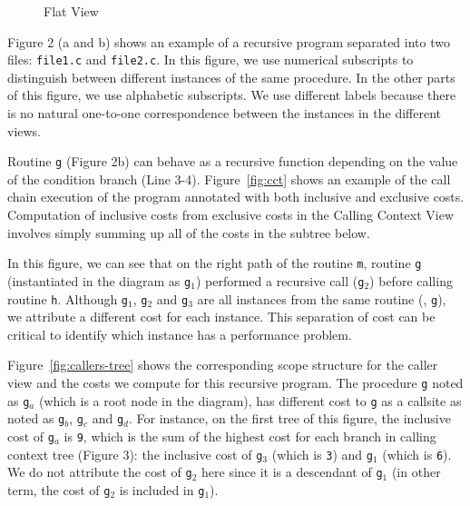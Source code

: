 \begin{figure}
\caption{Flat View}
\label{fig:flat-tree}
\end{figure}


Figure 2 (a and b) shows an example of a recursive program separated into two files:
\texttt{file1.c} and \texttt{file2.c}.
In this figure, we use numerical subscripts to distinguish between different instances of the same procedure.
In the other parts of this figure, we use alphabetic subscripts.
We use different labels because there is no natural one-to-one correspondence between the instances in the different views.

Routine \texttt{g} (Figure 2b) can behave as a recursive function depending on the value of the condition branch (Line 3-4).
Figure~\ref{fig:cct} shows an example of the call chain execution of the program annotated with both inclusive and exclusive costs.
Computation of inclusive costs from exclusive costs in the Calling Context View involves simply summing up all of the costs in the subtree below.

In this figure, we can see that on the right path of the routine \texttt{m}, routine \texttt{g} (instantiated in the diagram as \texttt{g$_1$}) performed a recursive call (\texttt{g$_2$}) before calling routine \texttt{h}.
Although \texttt{g$_1$}, \texttt{g$_2$} and \texttt{g$_3$} are all instances from the same routine (\ie{}, \texttt{g}), we attribute a different cost for each instance.
This separation of cost can be critical to identify which instance has a performance problem.

 Figure~\ref{fig:callers-tree} shows the corresponding scope structure for the caller view and the costs we compute for this recursive program. The procedure
\texttt{g} noted as \texttt{g$_a$} (which is a root node in the diagram), has different cost to \texttt{g} as a callsite as noted as \texttt{g$_b$}, \texttt{g$_c$} and \texttt{g$_d$}.
For instance, on the first tree of this figure, the inclusive cost of \texttt{g$_a$} is \texttt{9}, which is the sum of the highest cost for each branch in calling context tree (Figure 3): the inclusive cost of \texttt{g$_3$} (which is \texttt{3}) and \texttt{g$_1$} (which is \texttt{6}).
We do not attribute the cost of \texttt{g$_2$} here since it is a descendant of \texttt{g$_1$} (in other term, the cost of \texttt{g$_2$} is included in \texttt{g$_1$}).

